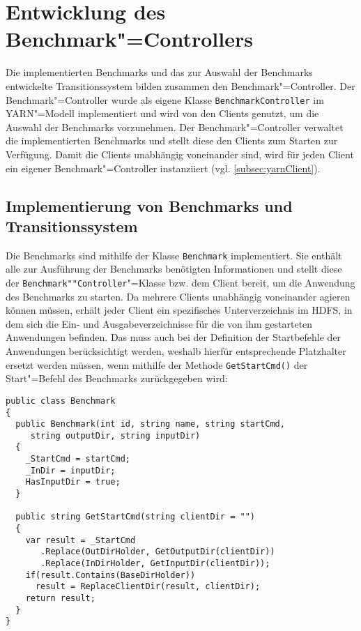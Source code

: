\section{Entwicklung des Benchmark"=Controllers}
\label{sec:benchmarkController}

Die implementierten Benchmarks und das zur Auswahl der Benchmarks entwickelte Transitionssystem bilden zusammen den Benchmark"=Controller.
Der Benchmark"=Controller wurde als eigene Klasse \texttt{BenchmarkController} im YARN"=Modell implementiert und wird von den Clients genutzt, um die Auswahl der Benchmarks vorzunehmen.
Der Benchmark"=Controller verwaltet die implementierten Benchmarks und stellt diese den Clients zum Starten zur Verfügung.
Damit die Clients unabhängig voneinander sind, wird für jeden Client ein eigener Benchmark"=Controller instanziiert (vgl. \cref{subsec:yarnClient}).

\subsection{Implementierung von Benchmarks und Transitionssystem}
\label{subsec:appImplementation}

Die Benchmarks sind mithilfe der Klasse \texttt{Benchmark} implementiert.
Sie enthält alle zur Ausführung der Benchmarks benötigten Informationen und stellt diese der \texttt{Benchmark""Controller}"=Klasse bzw. dem Client bereit, um die Anwendung des Benchmarks zu starten.
Da mehrere Clients unabhängig voneinander agieren können müssen, erhält jeder Client ein spezifisches Unterverzeichnis im HDFS, in dem sich die Ein- und Ausgabeverzeichnisse für die von ihm gestarteten Anwendungen befinden.
Das muss auch bei der Definition der Startbefehle der Anwendungen berücksichtigt werden, weshalb hierfür entsprechende Platzhalter ersetzt werden müssen, wenn mithilfe der Methode \texttt{GetStartCmd()} der Start"=Befehl des Benchmarks zurückgegeben wird:

\begin{lstlisting}[label=lst:benchmarkClass,style=cs,
caption={[Wesentliche Methoden der Klasse Benchmark]
    Wesentliche Methoden der Klasse \texttt{Benchmark}}]
public class Benchmark
{
  public Benchmark(int id, string name, string startCmd,
     string outputDir, string inputDir)
  {
    _StartCmd = startCmd;
    _InDir = inputDir;
    HasInputDir = true;
  }
  
  public string GetStartCmd(string clientDir = "")
  {
    var result = _StartCmd
       .Replace(OutDirHolder, GetOutputDir(clientDir))
       .Replace(InDirHolder, GetInputDir(clientDir));
    if(result.Contains(BaseDirHolder))
      result = ReplaceClientDir(result, clientDir);
    return result;
  }
}
\end{lstlisting}


